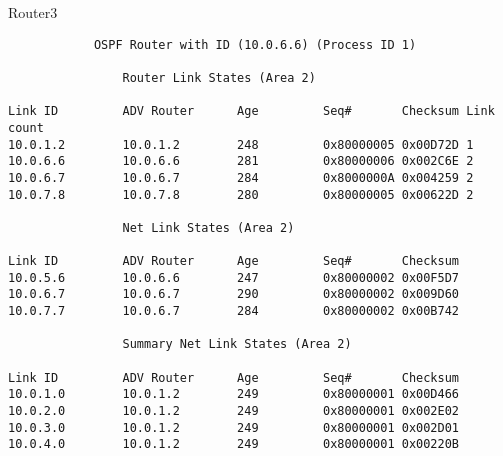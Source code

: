 Router3
\begin{lstlisting}
            OSPF Router with ID (10.0.6.6) (Process ID 1)                       
                                                                                
                Router Link States (Area 2)                                     
                                                                                
Link ID         ADV Router      Age         Seq#       Checksum Link count      
10.0.1.2        10.0.1.2        248         0x80000005 0x00D72D 1               
10.0.6.6        10.0.6.6        281         0x80000006 0x002C6E 2               
10.0.6.7        10.0.6.7        284         0x8000000A 0x004259 2               
10.0.7.8        10.0.7.8        280         0x80000005 0x00622D 2               
                                                                                
                Net Link States (Area 2)                                        
                                                                                
Link ID         ADV Router      Age         Seq#       Checksum                 
10.0.5.6        10.0.6.6        247         0x80000002 0x00F5D7                 
10.0.6.7        10.0.6.7        290         0x80000002 0x009D60                 
10.0.7.7        10.0.6.7        284         0x80000002 0x00B742                 
                                                                                
                Summary Net Link States (Area 2)                                
                                                                                
Link ID         ADV Router      Age         Seq#       Checksum                 
10.0.1.0        10.0.1.2        249         0x80000001 0x00D466                 
10.0.2.0        10.0.1.2        249         0x80000001 0x002E02                 
10.0.3.0        10.0.1.2        249         0x80000001 0x002D01                 
10.0.4.0        10.0.1.2        249         0x80000001 0x00220B    
\end{lstlisting}

